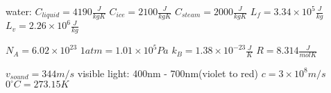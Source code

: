 \documentclass{exam}
\begin{document}
water: $C_{liquid}=4190\frac{J}{kgK}$
$C_{ice}=2100\frac{J}{kgK}$
$C_{steam}=2000\frac{J}{kgK}$
$L_f=3.34\times10^5 \frac{J}{kg}$
$L_v=2.26\times10^6 \frac{J}{kg}$

$N_A = 6.02\times 10^{23}$
$1atm = 1.01\times 10^5 Pa$
$k_B = 1.38\times 10^{-23}\frac{J}{K}$
$R = 8.314 \frac{J}{mol K}$

$v_{sound}=344m/s$
visible light: 400nm - 700nm(violet to red)
$c = 3\times10^8m/s$
$0^\circ C = 273.15K$
\end{document}

